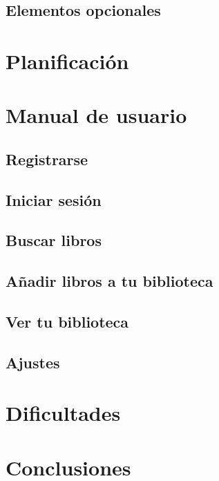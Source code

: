 \documentclass[a4paper,12pt]{report}
\begin{document}
    \section{Elementos opcionales}
  \chapter{Planificación}
  \chapter{Manual de usuario}
    \section{Registrarse}
    \section{Iniciar sesión}
    \section{Buscar libros}
    \section{Añadir libros a tu biblioteca}
    \section{Ver tu biblioteca}
    \section{Ajustes}
  \chapter{Dificultades}
  \chapter{Conclusiones}
\end{document}
